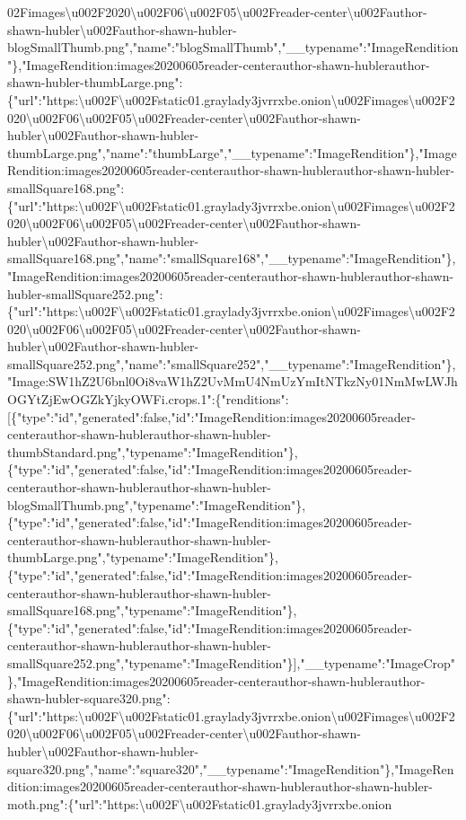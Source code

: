 02Fimages\textbackslash{}u002F2020\textbackslash{}u002F06\textbackslash{}u002F05\textbackslash{}u002Freader-center\textbackslash{}u002Fauthor-shawn-hubler\textbackslash{}u002Fauthor-shawn-hubler-blogSmallThumb.png","name":"blogSmallThumb","\_\_typename":"ImageRendition"\},"ImageRendition:images20200605reader-centerauthor-shawn-hublerauthor-shawn-hubler-thumbLarge.png":\{"url":"https:\textbackslash{}u002F\textbackslash{}u002Fstatic01.graylady3jvrrxbe.onion\textbackslash{}u002Fimages\textbackslash{}u002F2020\textbackslash{}u002F06\textbackslash{}u002F05\textbackslash{}u002Freader-center\textbackslash{}u002Fauthor-shawn-hubler\textbackslash{}u002Fauthor-shawn-hubler-thumbLarge.png","name":"thumbLarge","\_\_typename":"ImageRendition"\},"ImageRendition:images20200605reader-centerauthor-shawn-hublerauthor-shawn-hubler-smallSquare168.png":\{"url":"https:\textbackslash{}u002F\textbackslash{}u002Fstatic01.graylady3jvrrxbe.onion\textbackslash{}u002Fimages\textbackslash{}u002F2020\textbackslash{}u002F06\textbackslash{}u002F05\textbackslash{}u002Freader-center\textbackslash{}u002Fauthor-shawn-hubler\textbackslash{}u002Fauthor-shawn-hubler-smallSquare168.png","name":"smallSquare168","\_\_typename":"ImageRendition"\},"ImageRendition:images20200605reader-centerauthor-shawn-hublerauthor-shawn-hubler-smallSquare252.png":\{"url":"https:\textbackslash{}u002F\textbackslash{}u002Fstatic01.graylady3jvrrxbe.onion\textbackslash{}u002Fimages\textbackslash{}u002F2020\textbackslash{}u002F06\textbackslash{}u002F05\textbackslash{}u002Freader-center\textbackslash{}u002Fauthor-shawn-hubler\textbackslash{}u002Fauthor-shawn-hubler-smallSquare252.png","name":"smallSquare252","\_\_typename":"ImageRendition"\},"Image:SW1hZ2U6bnl0Oi8vaW1hZ2UvMmU4NmUzYmItNTkzNy01NmMwLWJhOGYtZjEwOGZkYjkyOWFi.crops.1":\{"renditions":{[}\{"type":"id","generated":false,"id":"ImageRendition:images20200605reader-centerauthor-shawn-hublerauthor-shawn-hubler-thumbStandard.png","typename":"ImageRendition"\},\{"type":"id","generated":false,"id":"ImageRendition:images20200605reader-centerauthor-shawn-hublerauthor-shawn-hubler-blogSmallThumb.png","typename":"ImageRendition"\},\{"type":"id","generated":false,"id":"ImageRendition:images20200605reader-centerauthor-shawn-hublerauthor-shawn-hubler-thumbLarge.png","typename":"ImageRendition"\},\{"type":"id","generated":false,"id":"ImageRendition:images20200605reader-centerauthor-shawn-hublerauthor-shawn-hubler-smallSquare168.png","typename":"ImageRendition"\},\{"type":"id","generated":false,"id":"ImageRendition:images20200605reader-centerauthor-shawn-hublerauthor-shawn-hubler-smallSquare252.png","typename":"ImageRendition"\}{]},"\_\_typename":"ImageCrop"\},"ImageRendition:images20200605reader-centerauthor-shawn-hublerauthor-shawn-hubler-square320.png":\{"url":"https:\textbackslash{}u002F\textbackslash{}u002Fstatic01.graylady3jvrrxbe.onion\textbackslash{}u002Fimages\textbackslash{}u002F2020\textbackslash{}u002F06\textbackslash{}u002F05\textbackslash{}u002Freader-center\textbackslash{}u002Fauthor-shawn-hubler\textbackslash{}u002Fauthor-shawn-hubler-square320.png","name":"square320","\_\_typename":"ImageRendition"\},"ImageRendition:images20200605reader-centerauthor-shawn-hublerauthor-shawn-hubler-moth.png":\{"url":"https:\textbackslash{}u002F\textbackslash{}u002Fstatic01.graylady3jvrrxbe.onion\textba